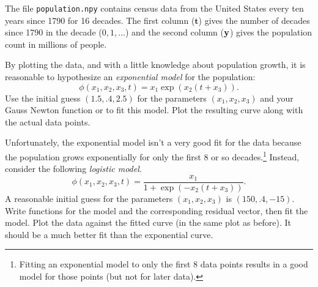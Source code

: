 
\begin{problem}
The file \texttt{population.npy} contains census data from the United States every ten years since 1790 for 16 decades.
The first column ($\mathbf{t}$) gives the number of decades since 1790 in the decade ($0,1,\ldots$) and the second column ($\mathbf{y}$) gives the population count in millions of people.

By plotting the data, and with a little knowledge about population growth, it is reasonable to hypothesize an \emph{exponential model} for the population:
\[
\phi(x_1,x_2,x_3,t) = x_1\exp(x_2(t+x_3)).
\]
Use the initial guess $(1.5, .4, 2.5)$ for the parameters $(x_1, x_2, x_3)$ and your Gauss Newton function or  to fit this model.
Plot the resulting curve along with the actual data points.

Unfortunately, the exponential model isn't a very good fit for the data because the population grows exponentially for only the first 8 or so decades.\footnote{Fitting an exponential model to only the first 8 data points results in a good model for those points (but not for later data).}
Instead, consider the following \emph{logistic model}.
$$
\phi(x_1,x_2,x_3,t) = \frac{x_1}{1+\exp(-x_2(t+x_3))}.
$$
A reasonable initial guess for the parameters $(x_1, x_2, x_3)$ is $(150, .4, -15)$.
Write functions for the model and the corresponding residual vector, then fit the model.
Plot the data against the fitted curve (in the same plot as before).
It should be a much better fit than the exponential curve.
\end{problem}

